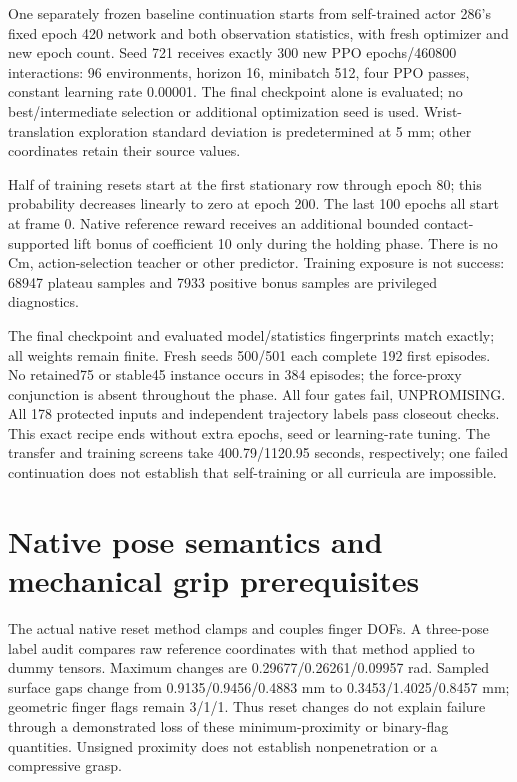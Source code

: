 \documentclass[10pt]{article}
\begin{document}
\begin{table}[h]
\centering

\caption{Synthetic plateau episodes. Transfer and continuation use different cohorts and actor configurations; these rows are separate feasibility screens, not a matched treatment comparison.}
\end{table}

One separately frozen baseline continuation starts from self-trained actor 286's
fixed epoch 420 network and both observation statistics, with fresh optimizer and
new epoch count. Seed 721 receives exactly 300 new PPO epochs/460800 interactions:
96 environments, horizon 16, minibatch 512, four PPO passes, constant learning rate
0.00001. The final checkpoint alone is evaluated; no best/intermediate selection
or additional optimization seed is used. Wrist-translation exploration standard
deviation is predetermined at 5 mm; other coordinates retain their source values.

Half of training resets start at the first stationary row through epoch 80; this
probability decreases linearly to zero at epoch 200. The last 100 epochs all start
at frame 0. Native reference reward receives an additional bounded contact-supported
lift bonus of coefficient 10 only during the holding phase. There is no Cm,
action-selection teacher or other predictor. Training exposure is not success:
68947 plateau samples and 7933 positive bonus samples are privileged diagnostics.

The final checkpoint and evaluated model/statistics fingerprints match exactly;
all weights remain finite. Fresh seeds 500/501 each complete 192 first episodes.
No retained75 or stable45 instance occurs in 384 episodes; the force-proxy conjunction
is absent throughout the phase. All four gates fail, UNPROMISING. All 178 protected
inputs and independent trajectory labels pass closeout checks. This exact recipe
ends without extra epochs, seed or learning-rate tuning. The transfer and training
screens take 400.79/1120.95 seconds, respectively; one failed continuation does not
establish that self-training or all curricula are impossible.

\section{Native pose semantics and mechanical grip prerequisites}
The actual native reset method clamps and couples finger DOFs. A three-pose label
audit compares raw reference coordinates with that method applied to dummy tensors.
Maximum changes are 0.29677/0.26261/0.09957 rad. Sampled surface gaps change from
0.9135/0.9456/0.4883 mm to 0.3453/1.4025/0.8457 mm; geometric finger flags remain 3/1/1.
Thus reset changes do not explain failure through a demonstrated loss of these
minimum-proximity or binary-flag quantities. Unsigned proximity does not establish
nonpenetration or a compressive grasp.
\end{document}
